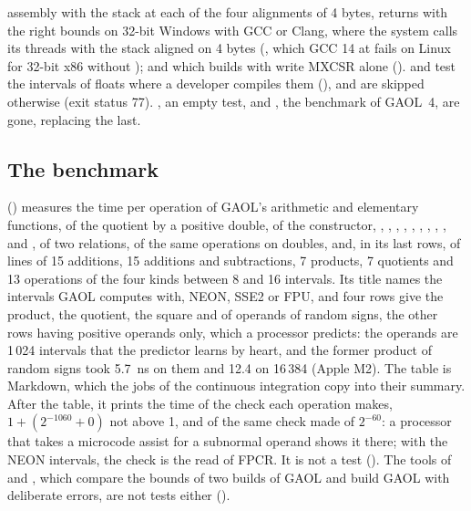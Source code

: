\documentclass[12pt,a4paper,twoside,openright]{book}
\begin{document}
assembly with the stack at each of the four alignments of 4 bytes, returns
with the right bounds on 32-bit Windows with GCC or Clang, where the system
calls its threads with the stack aligned on 4 bytes
(, which GCC 14 at
 fails on Linux for 32-bit x86 without );
and which builds with  write MXCSR alone
().\newinvfive{}
 and  test the intervals of floats where a
developer compiles them (), and are skipped
otherwise (exit status 77). , an empty test,
 and , the benchmark of
GAOL~4, are gone,  replacing the last.\newinvfive

\subsection{The benchmark}
%

 () measures the time per
operation of GAOL's arithmetic and elementary functions, of the quotient by a
positive double, of the constructor, , ,
, , , ,
, , ,
 and , of two relations, of the same
operations on doubles, and, in its last rows, of lines of 15 additions, 15
additions and subtractions, 7 products, 7 quotients and 13 operations of the
four kinds between 8 and 16 intervals.\newinvfive{} Its title names the
intervals GAOL computes with, NEON, SSE2 or FPU, and four rows give the
product, the quotient, the square and  of operands of random
signs, the other rows having positive operands only, which a processor
predicts: the operands are 1\,024 intervals that the predictor learns by
heart, and the former product of random signs took 5.7~ns on them and 12.4
on 16\,384 (Apple M2). The table is Markdown, which the jobs of the
continuous integration copy into their summary. After the table, it prints
the time of the check each operation makes, $1+(2^{-1060}+0)$ not above 1,
and of the same check made of $2^{-60}$: a processor that takes a microcode
assist for a subnormal operand shows it there; with the NEON intervals, the
check is the read of FPCR. It is not a test (). The
tools of  and , which
compare the bounds of two builds of GAOL and build GAOL with deliberate
errors, are not tests either ().
\end{document}
